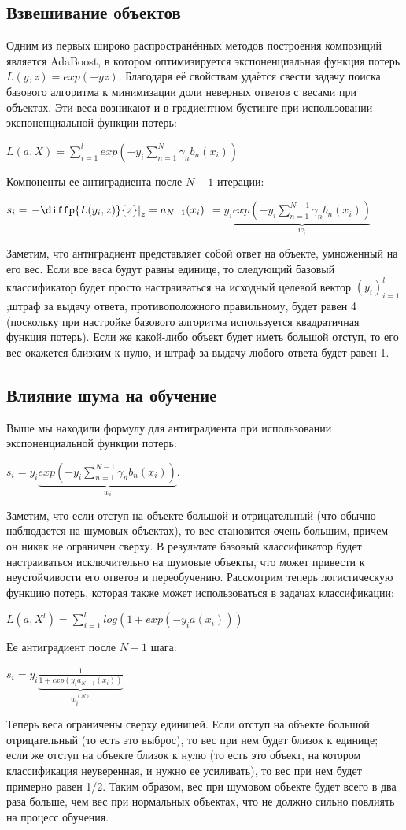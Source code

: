 \documentclass{article}
\begin{document}
\subsection{Взвешивание объектов}

Одним из первых широко распространённых методов построения композиций является AdaBoost, в котором оптимизируется экспоненциальная функция потерь $L(y,z)= exp(-yz)$. Благодаря её свойствам удаётся свести задачу поиска базового алгоритма к минимизации доли неверных ответов с весами при объектах. Эти веса возникают и в градиентном бустинге при использовании экспоненциальной функции потерь:

$L(a,X) = \sum_{i=1}^{l} exp\left(-y_i\sum_{n=1}^{N}\gamma_nb_n(x_i)\right)$

Компоненты ее антиградиента после $N-1$ итерации:

$s_i=\left. -\diffp{L(y_i,z)}{z}\right|_z=a_{N-1}(x_i)$ $=y_i\underbrace{exp\left(-y_i\sum_{n=1}^{N-1}\gamma_nb_n(x_i)\right)}_{w_i}$

Заметим, что антиградиент представляет собой ответ на объекте, умноженный на его вес. Если все веса будут равны единице, то следующий базовый классификатор будет просто настраиваться на исходный целевой вектор $(y_i)^l_{i=1}$;штраф за выдачу ответа, противоположного правильному, будет равен 4 (поскольку при настройке базового алгоритма используется квадратичная функция потерь). Если же какой-либо объект будет иметь большой отступ, то его вес окажется близким к нулю, и штраф за выдачу любого ответа будет равен 1.

\subsection{Влияние шума на обучение}

Выше мы находили формулу для антиградиента при использовании экспоненциальной функции потерь:

$s_i=y_i\underbrace{exp\left(-y_i\sum_{n=1}^{N-1}\gamma_nb_n(x_i)\right)}_{w_i}$.

Заметим, что если отступ на объекте большой и отрицательный (что обычно наблюдается на шумовых объектах), то вес становится очень большим, причем он никак не ограничен сверху. В результате базовый классификатор будет настраиваться исключительно на шумовые объекты, что может привести к неустойчивости его ответов и переобучению.
Рассмотрим теперь логистическую функцию потерь, которая также может использоваться в задачах классификации:

$L(a,X^l) = \sum_{i=1}^{l}log(1+exp(-y_ia(x_i)))$

Ее антиградиент после $N-1$ шага:

$s_i = y_i \underbrace{\frac{1}{1+exp(y_ia_{N-1}(x_i))}}_{w_i^{(N)}}$

Теперь веса ограничены сверху единицей. Если отступ на объекте большой отрицательный (то есть это выброс), то вес при нем будет близок к единице; если же отступ на объекте близок к нулю (то есть это объект, на котором классификация неуверенная, и нужно ее усиливать), то вес при нем будет примерно равен 1/2. Таким образом,
вес при шумовом объекте будет всего в два раза больше, чем вес при нормальных объектах, что не должно сильно повлиять на процесс обучения.
\end{document}
